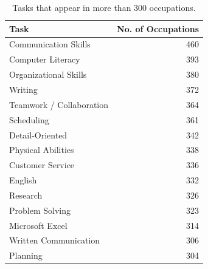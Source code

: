 \documentclass[letterpaper]{article} %
\begin{document}
\begin{table}[h!]
\centering
\scriptsize
\begin{tabular}{l | r}
                        Task &  No. of Occupations \\
\hline
        Communication Skills &                 460 \\
           Computer Literacy &                 393 \\
       Organizational Skills &                 380 \\
                     Writing &                 372 \\
    Teamwork / Collaboration &                 364 \\
                  Scheduling &                 361 \\
             Detail-Oriented &                 342 \\
          Physical Abilities &                 338 \\
            Customer Service &                 336 \\
                     English &                 332 \\
                    Research &                 326 \\
             Problem Solving &                 323 \\
             Microsoft Excel &                 314 \\
       Written Communication &                 306 \\
                    Planning &                 304 \\
\hline
\end{tabular}
\caption{Tasks that appear in more than 300 occupations.
\label{table:task2soc}}
\end{table}
\end{document}
